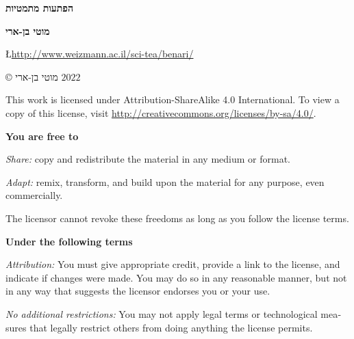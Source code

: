 
\pagestyle{empty}

\begin{center}
\textbf{\Huge הפתעות מתמטיות}
 
\bigskip
\bigskip
\bigskip
\bigskip

\textbf{\Large מוטי בן-ארי}

\bigskip
\bigskip


\L{\url{http://www.weizmann.ac.il/sci-tea/benari/}}
\end{center}


\newpage

\begin{center}
\copyright{} מוטי בן-ארי
$2022$
 \end{center}

\begin{english}
\begin{small}
This work is licensed under Attribution-ShareAlike 4.0 International. To view a copy of this license, visit \url{http://creativecommons.org/licenses/by-sa/4.0/}.

\begin{center}\bf You are free to\end{center}

\textit{Share:} copy and redistribute the material in any medium or format.

\textit{Adapt:} remix, transform, and build upon the material
for any purpose, even commercially.

The licensor cannot revoke these freedoms as long as you follow the license terms.

\begin{center}\bf Under the following terms\end{center}

\textit{Attribution:} You must give appropriate credit, provide a link to the license, and indicate if changes were made. You may do so in any reasonable manner, but not in any way that suggests the licensor endorses you or your use.

\textit{No additional restrictions:} You may not apply legal terms or technological measures that legally restrict others from doing anything the license permits.
\end{small}
\end{english}



